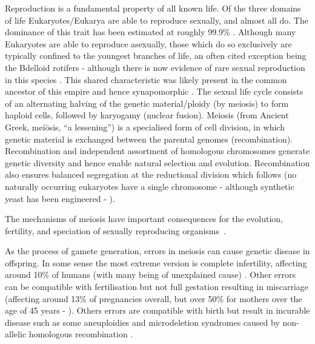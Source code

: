 Reproduction is a fundamental property of all known life.
Of the three domains of life Eukaryotes/Eukarya are able to reproduce sexually, and almost all do.
The dominance of this trait has been estimated at roughly 99.9\% \parencite{White1978Modes}.
Although many Eukaryotes are able to reproduce asexually, those which do so exclusively are typically confined to the youngest branches of life, an often cited exception being the Bdelloid rotifers - although there is now evidence of rare sexual reproduction in this species \parencite{Debortoli2016Genetic, Laine2020Sexual}.
This shared characteristic was likely present in the common ancestor of this empire and hence synapomorphic \parencite{Bernstein2013Evolutionary}.
The sexual life cycle consists of an alternating halving of the genetic material/ploidy (by meiosis) to form haploid cells, followed by karyogamy (nuclear fusion).
Meiosis (from Ancient Greek, meíōsis, “a lessening”) is a specialised form of cell division, in which genetic material is exchanged between the parental genomes (recombination).
Recombination and independent assortment of homologous chromosomes generate genetic diversity and hence enable natural selection and evolution.
Recombination also ensures balanced segregation at the reductional division which follows (no naturally occurring eukaryotes have a single chromosome - although synthetic yeast has been engineered - \cite{Shao2018Creating}).

The mechanisms of meiosis have important consequences for the evolution, fertility, and speciation of sexually reproducing organisms~\parencite{Davies2016Reengineering,Hassold2007Origin}. 


As the process of gamete generation, errors in meiosis can cause genetic disease in offspring.
In some sense the most extreme version is complete infertility, affecting around 10\% of humans (with many being of unexplained cause) \parencite{Datta2016Prevalence, Hamada2011Unexplained}.
Other errors can be compatible with fertilisation but not full gestation resulting in miscarriage (affecting around 13\% of pregnancies overall, but over 50\% for mothers over the age of 45 years - \cite{Magnus2019Role}).
Others errors are compatible with birth but result in incurable disease such as some aneuploidies \parencite{Hassold2007Origin} and microdeletion syndromes caused by non-allelic homologous recombination \parencite{Myers2008common}.


